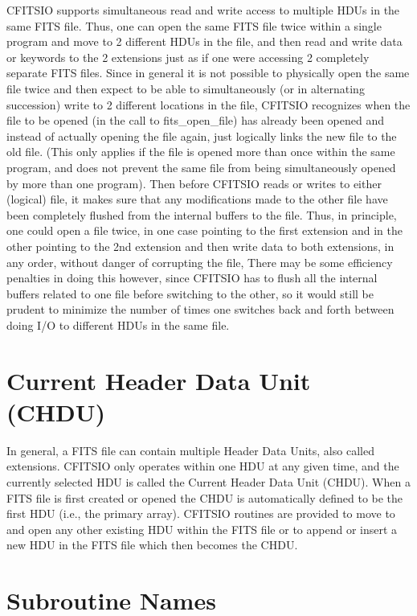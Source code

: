 \documentclass[11pt]{book}
\begin{document}
CFITSIO supports simultaneous read and write access to multiple HDUs in
the same FITS file.  Thus, one can open the same FITS file twice within
a single program and move to 2 different HDUs in the file, and then
read and write data or keywords to the 2 extensions just as if one were
accessing 2 completely separate FITS files.   Since in general it is
not possible to physically open the same file twice and then expect to
be able to simultaneously (or in alternating succession) write to 2
different locations in the file, CFITSIO recognizes when the file to be
opened (in the call to fits\_open\_file) has already been opened and
instead of actually opening the file again, just logically links the
new file to the old file.  (This only applies if the file is opened
more than once within the same program, and does not prevent the same
file from being simultaneously opened by more than one program).  Then
before CFITSIO reads or writes to either (logical) file, it makes sure
that any modifications made to the other file have been completely
flushed from the internal buffers to the file.  Thus, in principle, one
could open a file twice, in one case pointing to the first extension
and in the other pointing to the 2nd extension and then write data to
both extensions, in any order, without danger of corrupting the file,
There may be some efficiency penalties in doing this however, since
CFITSIO has to flush all the internal buffers related to one file
before switching to the  other, so it would still be prudent to
minimize the number of times one switches back and forth between doing
I/O to different HDUs in the same file.


\section{Current Header Data Unit (CHDU)}

In general, a FITS file can contain multiple Header Data Units, also
called extensions.  CFITSIO only operates within one HDU at any given
time, and the currently selected HDU is called the Current Header Data
Unit (CHDU).  When a FITS file is first created or opened the CHDU is
automatically defined to be the first HDU (i.e., the primary array).
CFITSIO routines are provided to move to and open any other existing
HDU within the FITS file or to append or insert a new HDU in the FITS
file which then becomes the CHDU.


\section{Subroutine Names}
\end{document}
